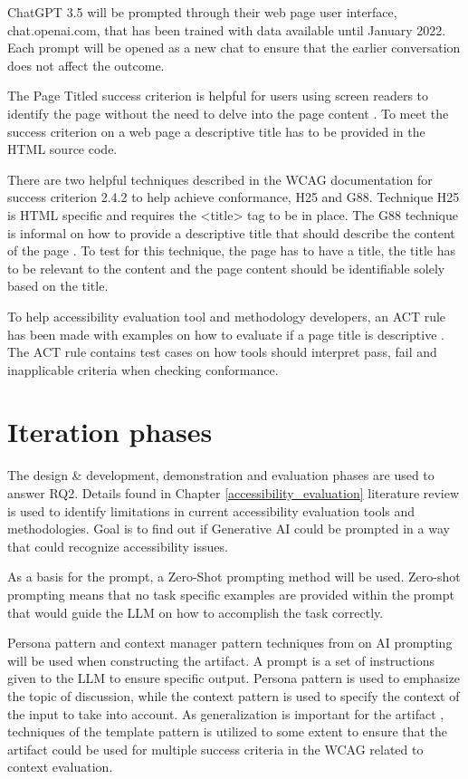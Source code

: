 ChatGPT 3.5 will be prompted through their web page user interface, chat.openai.com, that has been trained with data available until January 2022. Each prompt will be opened as a new chat to ensure that the earlier conversation does not affect the outcome.

The Page Titled success criterion is helpful for users using screen readers to identify the page without the need to delve into the page content \citep{wcag_page_titled}. To meet the success criterion on a web page a descriptive title has to be provided in the HTML source code. 

There are two helpful techniques described in the WCAG documentation for success criterion 2.4.2 to help achieve conformance, H25 and G88. Technique H25 is HTML specific and requires the <title> tag to be in place. The G88 technique is informal on how to provide a descriptive title that should describe the content of the page \citep{g88}. To test for this technique, the page has to have a title, the title has to be relevant to the content and the page content should be identifiable solely based on the title.

To help accessibility evaluation tool and methodology developers, an ACT rule has been made with examples on how to evaluate if a page title is descriptive \citep{act_rule_g88}. The ACT rule contains test cases on how tools should interpret pass, fail and inapplicable criteria when checking conformance. 

\section{Iteration phases}

The design \& development, demonstration and evaluation phases are used to answer RQ2. Details found in Chapter \ref{accessibility_evaluation} literature review is used to identify limitations in current accessibility evaluation tools and methodologies. Goal is to find out if Generative AI could be prompted in a way that could recognize accessibility issues. 

As a basis for the prompt, a Zero-Shot prompting method will be used. Zero-shot prompting means that no task specific examples are provided within the prompt that would guide the LLM on how to accomplish the task correctly.

Persona pattern and context manager pattern techniques from \textcite{white2023prompt} on AI prompting will be used when constructing the artifact. A prompt is a set of instructions given to the LLM to ensure specific output. Persona pattern is used to emphasize the topic of discussion, while the context pattern is used to specify the context of the input to take into account. As generalization is important for the artifact \citep{design_science_eval}, techniques of the template pattern is utilized to some extent to ensure that the artifact could be used for multiple success criteria in the WCAG related to context evaluation.

